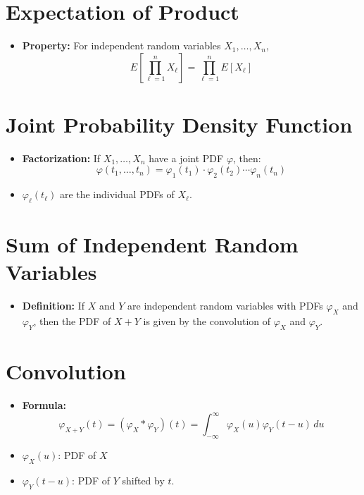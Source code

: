 \documentclass{article}
\begin{document}
\section*{Expectation of Product}
\begin{itemize}
    \item \textbf{Property:} For independent random variables $X_1, \ldots, X_n$,
    \[
    E\left[ \prod_{\ell=1}^{n} X_\ell \right] = \prod_{\ell=1}^{n} E[X_\ell]
    \]
\end{itemize}

\section*{Joint Probability Density Function}
\begin{itemize}
    \item \textbf{Factorization:} If $X_1, \ldots, X_n$ have a joint PDF $\varphi$, then:
    \[
    \varphi(t_1, \ldots, t_n) = \varphi_1(t_1) \cdot \varphi_2(t_2) \cdots \varphi_n(t_n)
    \]
    \item $\varphi_\ell(t_\ell)$ are the individual PDFs of $X_\ell$.
\end{itemize}

\section*{Sum of Independent Random Variables}
\begin{itemize}
    \item \textbf{Definition:} If $X$ and $Y$ are independent random variables with PDFs $\varphi_X$ and $\varphi_Y$, then the PDF of $X + Y$ is given by the convolution of $\varphi_X$ and $\varphi_Y$.
\end{itemize}

\section*{Convolution}
\begin{itemize}
    \item \textbf{Formula:}
    \[
    \varphi_{X+Y}(t) = (\varphi_X * \varphi_Y)(t) = \int_{-\infty}^{\infty} \varphi_X(u) \varphi_Y(t - u) \, du
    \]
    \item $\varphi_X(u)$: PDF of $X$ 
    \item $\varphi_Y(t - u)$: PDF of $Y$ shifted by $t$.
\end{itemize}
\end{document}
